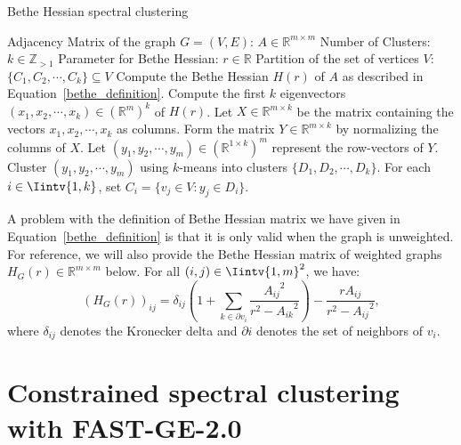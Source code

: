 \begin{algorithm}
\caption{Bethe Hessian spectral clustering}\label{bethe_clustering}
\begin{algorithmic}[1]
   \Require 
      \Statex Adjacency Matrix of the graph $G = (V,E)$: $A \in \mathbb R ^ {m \times m}$ 
      \Statex Number of Clusters: $k \in \mathbb Z_{>1}$
      \Statex Parameter for Bethe Hessian: $r \in \mathbb R$
   \Ensure 
      \Statex Partition of the set of vertices $V$: $\{ C_1, C_2, \cdots, C_k \} \subseteq V$
      \vspace{0.2 cm}
   \State Compute the Bethe Hessian $H(r)$ of $A$ as described in Equation~\vref{bethe_definition}.
   \State Compute the first $k$ eigenvectors $(x_1, x_2, \cdots, x_k) \in (\mathbb R^{m})^k$ of $H(r)$.
   \State Let $X \in \mathbb R^{m \times k}$ be the matrix containing the vectors $x_1, x_2, \cdots, x_k$ as columns.
   \State Form the matrix $Y \in \mathbb R^{m \times k}$ by normalizing the columns of $X$.
   \State Let $(y_1, y_2, \cdots, y_m) \in ( \mathbb R^{1 \times k} )^m$ represent the row-vectors of $Y$.
   \State Cluster $(y_1, y_2, \cdots, y_m)$ using $k$-means into clusters $\{ D_1, D_2, \cdots, D_k \} $.
   \State For each $i \in \Iintv{1,k}$, set $C_i = \{ v_j \in V: y_j \in D_i \}$.
\end{algorithmic}
\end{algorithm}


A problem with the definition of Bethe Hessian matrix we have given in Equation~\vref{bethe_definition} is that it is only valid when the graph is unweighted.
For reference, we will also provide the Bethe Hessian matrix of weighted graphs $H_G(r) \in \mathbb R^{m \times m}$ below. For all $(i,j) \in \Iintv{1,m}^2$, we have:
\begin{equation}
   \left( H_G(r) \right)_{ij} = \delta _{ij} \left( 1 + \sum _{k \in \partial v_i}\frac{{A_{ij}}^2}{r^2 - {A_{ik}}^2} \right) - \frac{r A_{ij}}{r^2 - {A_{ij}}^2},
\end{equation}
where $\delta_{ij}$ denotes the Kronecker delta and $\partial i$ denotes the set of neighbors of $v_i$.



\chapter{Constrained spectral clustering with FAST-GE-2.0}\label{fastge2chapter}

